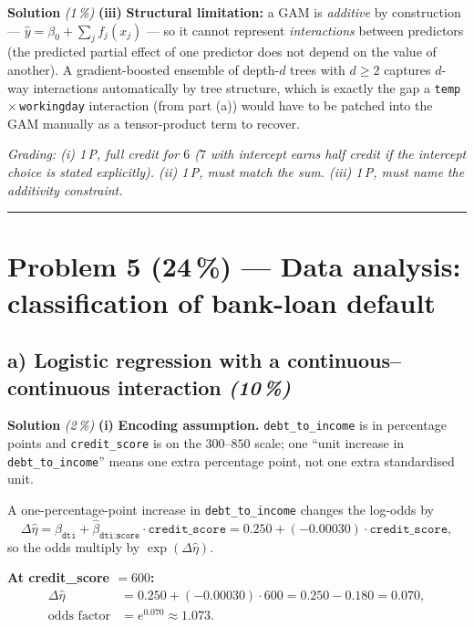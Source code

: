 \documentclass[11pt,a4paper]{article}
\newcommand{\points}[1]{\textbf{(#1\,\%)}}
\newcommand{\subpoints}[1]{\textit{(#1\,\%)}}
\newcommand{\sol}{\noindent\textbf{Solution}}
\begin{document}
\medskip
\sol{} \subpoints{1} \textbf{(iii)} \textbf{Structural limitation:} a GAM is \emph{additive} by
construction --- $\hat y = \beta_0 + \sum_j f_j(x_j)$ --- so it cannot represent
\emph{interactions} between predictors (the predicted partial effect of one predictor does not
depend on the value of another). A gradient-boosted ensemble of depth-$d$ trees with $d \ge 2$
captures $d$-way interactions automatically by tree structure, which is exactly the gap a
\texttt{temp}\,$\times$\,\texttt{workingday} interaction (from part (a)) would have to be patched
into the GAM manually as a tensor-product term to recover.

\noindent\emph{Grading: (i) 1\,P, full credit for $6$ ($7$ with intercept earns half credit if the
intercept choice is stated explicitly). (ii) 1\,P, must match the sum. (iii) 1\,P, must name the
additivity constraint.}

\vspace{0.6em}
\hrule
\vspace{1em}

\section*{Problem 5 \points{24} --- Data analysis: classification of bank-loan default}

\subsection*{a) Logistic regression with a continuous--continuous interaction \subpoints{10}}

\sol{} \subpoints{2} \textbf{(i)} \textbf{Encoding assumption.} \texttt{debt\_to\_income} is in
percentage points and \texttt{credit\_score} is on the $300$--$850$ scale; one ``unit increase in
\texttt{debt\_to\_income}'' means one extra percentage point, not one extra standardised unit.

A one-percentage-point increase in \texttt{debt\_to\_income} changes the log-odds by
$$\Delta\hat\eta = \hat\beta_{\texttt{dti}} + \hat\beta_{\texttt{dti:score}}\cdot\texttt{credit\_score}
   = 0.250 + (-0.00030)\cdot\texttt{credit\_score},$$
so the odds multiply by $\exp(\Delta\hat\eta)$.

\textbf{At credit\_score $= 600$:}
\begin{align*}
\Delta\hat\eta &= 0.250 + (-0.00030)\cdot 600 = 0.250 - 0.180 = 0.070, \\
\text{odds factor} &= e^{0.070} \approx \boxed{1.073}.
\end{align*}
\end{document}
